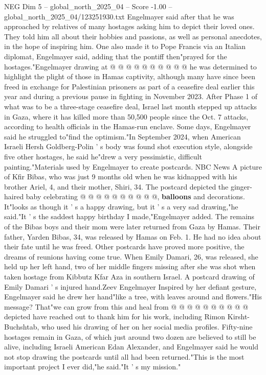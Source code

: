 \begin{textsample}{NEG Dim 5 – global\_north\_2025\_04 – Score -1.00 – global\_north\_2025\_04/123251930.txt}
Engelmayer said after that he was approached by relatives of many hostages asking him to depict their loved ones.
They told him all about their hobbies and passions, as well as personal anecdotes, in the hope of inspiring him.
One also made it to Pope Francis via an Italian diplomat, Engelmayer said, adding that the pontiff then"prayed for the hostages."Engelmayer drawing at @ @ @ @ @ @ @ @ @ @ he was determined to highlight the plight of those in Hamas captivity, although many have since been freed in exchange for Palestinian prisoners as part of a ceasefire deal earlier this year and during a previous pause in fighting in November 2023.
After Phase 1 of what was to be a three-stage ceasefire deal, Israel last month stepped up attacks in Gaza, where it has killed more than 50,500 people since the Oct. 7 attacks, according to health officials in the Hamas-run enclave.
Some days, Engelmayer said he struggled to"find the optimism."In September 2024, when American Israeli Hersh Goldberg-Polin ' s body was found shot execution style, alongside five other hostages, he said he"drew a very pessimistic, difficult painting."Materials used by Engelmayer to create postcards.
NBC News A picture of Kfir Bibas, who was just 9 months old when he was kidnapped with his brother Ariel, 4, and their mother, Shiri, 34.
The postcard depicted the ginger-haired baby celebrating @ @ @ @ @ @ @ @ @ @, \textbf{balloons} and decorations.
It"looks as though it ' s a happy drawing, but it ' s a very sad drawing,"he said."It ' s the saddest happy birthday I made,"Engelmayer added.
The remains of the Bibas boys and their mom were later returned from Gaza by Hamas.
Their father, Yarden Bibas, 34, was released by Hamas on Feb. 1.
He had no idea about their fate until he was freed.
Other postcards have proved more positive, the dreams of reunions having come true.
When Emily Damari, 26, was released, she held up her left hand, two of her middle fingers missing after she was shot when taken hostage from Kibbutz Kfar Aza in southern Israel.
A postcard drawing of Emily Damari ' s injured hand.Zeev Engelmayer Inspired by her defiant gesture, Engelmayer said he drew her hand"like a tree, with leaves around and flowers."His message?
That"we can grow from this and heal from @ @ @ @ @ @ @ @ @ @ depicted have reached out to thank him for his work, including Rimon Kirsht-Buchshtab, who used his drawing of her on her social media profiles.
Fifty-nine hostages remain in Gaza, of which just around two dozen are believed to still be alive, including Israeli American Edan Alexander, and Engelmayer said he would not stop drawing the postcards until all had been returned."This is the most important project I ever did,"he said."It ' s my mission."

\end{textsample}
